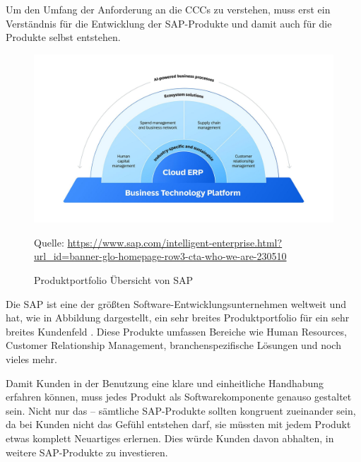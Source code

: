 \documentclass[../main.tex]{subfiles}
\begin{document}
Um den Umfang der Anforderung an die \glspl{CCC} zu verstehen, muss erst ein Verständnis für die Entwicklung der SAP-Produkte und damit auch für die Produkte selbst entstehen.

\begin{figure}[ht]
    \centering
    \includegraphics[scale=.21]{"bilder/produktportfolio.jpg"}
    \caption{Produktportfolio Übersicht von SAP}
    \footnotesize Quelle: \url{https://www.sap.com/intelligent-enterprise.html?url_id=banner-glo-homepage-row3-cta-who-we-are-230510}
    \label{fig:produktportfolio}
\end{figure}

Die SAP ist eine der größten Software-Entwicklungsunternehmen weltweit und hat, wie in Abbildung  dargestellt, ein sehr breites Produktportfolio für ein sehr breites Kundenfeld  \cite{CorporateFactSheet}.
Diese Produkte umfassen Bereiche wie Human Resources, Customer Relationship Management, branchenspezifische Lösungen und noch vieles mehr.

Damit Kunden in der Benutzung eine klare und einheitliche Handhabung erfahren können, muss jedes Produkt als Softwarekomponente genauso gestaltet sein.
Nicht nur das -- sämtliche SAP-Produkte sollten kongruent zueinander sein, da bei Kunden nicht das Gefühl entstehen darf, sie müssten mit jedem Produkt etwas komplett Neuartiges erlernen.
Dies würde Kunden davon abhalten, in weitere SAP-Produkte zu investieren.
\cite{SAPUsability}
\end{document}
